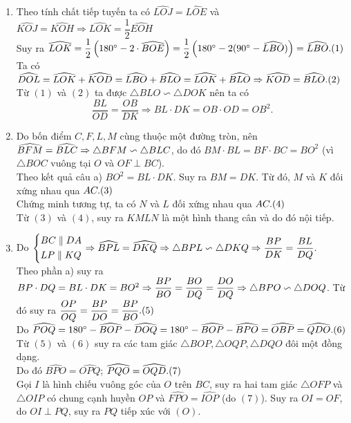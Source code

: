 \begin{ex}
{\begin{center}
\begin{tikzpicture}[scale=1, line join=round, line cap=round]
			
			\end{tikzpicture}
		\end{center}
	\begin{enumerate}
		\item Theo tính chất tiếp tuyến ta có $\widehat{LOJ}=\widehat{LOE}$ và $\widehat{KOJ}=\widehat{KOH} \Rightarrow \widehat{LOK}=\dfrac{1}{2}\widehat{EOH}$\\
		Suy ra $\widehat{LOK}=\dfrac{1}{2}\left(180^\circ - 2\cdot \widehat{BOE}\right)=\dfrac{1}{2}\left(180^\circ -2(90^\circ -\widehat{LBO})\right)= \widehat{LBO}. \hfill (1)$\\
		Ta có $\widehat{DOL}=\widehat{LOK}+\widehat{KOD}=\widehat{LBO}+\widehat{BLO}=\widehat{LOK}+\widehat{BLO} \Rightarrow \widehat{KOD}=\widehat{BLO}. \hfill (2)$\\
		Từ $(1)$ và $(2)$ ta được $\triangle BLO \backsim \triangle DOK$  nên ta có $$\dfrac{BL}{OD}=\dfrac{OB}{DK} \Rightarrow BL \cdot DK =OB\cdot OD =OB^2.$$
		\item Do bốn điểm $C,F,L,M$ cùng thuộc một đường tròn, nên $\widehat{BFM}=\widehat{BLC} \\ \Rightarrow \triangle BFM \backsim \triangle BLC$, do đó $BM \cdot BL = BF \cdot BC =BO^2$ (vì $\triangle BOC$ vuông tại $O$ và $OF \perp BC$).\\
		Theo kết quả câu a) $BO^2=BL \cdot DK.$ Suy ra $BM=DK.$ Từ đó, $M$ và $K$ đối xứng nhau qua $AC. \hfill (3)$\\
		Chứng minh tương tự, ta có $N$ và $L$ đối xứng nhau qua $AC. \hfill (4)$
	\\ Từ $(3)$ và $(4)$, suy ra $KMLN$ là một hình thang cân và do đó nội tiếp.
	\item  Do $\heva{& BC \parallel DA\\& LP \parallel KQ} \Rightarrow \widehat{BPL} =\widehat{ DKQ} \Rightarrow \triangle BPL \backsim \triangle DKQ \Rightarrow \dfrac{BP}{DK}=\dfrac{BL}{DQ}.$\\
	Theo phần a) suy ra $BP\cdot DQ =BL \cdot DK =BO^2 \Rightarrow \dfrac{BP}{BO}=\dfrac{BO}{DQ}=\dfrac{DO}{DQ} \\ \Rightarrow \triangle BPO \backsim \triangle DOQ$.
	Từ đó suy ra $\dfrac{OP}{OQ}=\dfrac{BP}{DO}=\dfrac{BP}{BO}. \hfill (5)$\\
	Do $\widehat{POQ}=180^\circ - \widehat{BOP} -\widehat{DOQ}=180^\circ -\widehat{BOP}- \widehat{BPO}=\widehat{OBP}=\widehat{QDO}. \hfill (6)$\\
	Từ $(5)$ và $(6)$ suy ra các tam giác $\triangle BOP, \triangle OQP, \triangle DQO$ đôi một đồng dạng.\\
	Do đó $\widehat{BPO}=\widehat{OPQ}$; $\widehat{PQO}=\widehat{OQD}. \hfill (7)$\\
	Gọi $I$ là hình chiếu vuông góc của $O$ trên $BC$, suy ra hai tam giác $\triangle OFP$ và $\triangle OIP$ có chung cạnh huyền $OP$ và $\widehat{FPO}=\widehat{IOP}$ (do $(7)$). Suy ra $OI=OF$, do $OI \perp PQ$, suy ra $PQ$ tiếp xúc với $(O).$
\end{enumerate}
	}
\end{ex}

